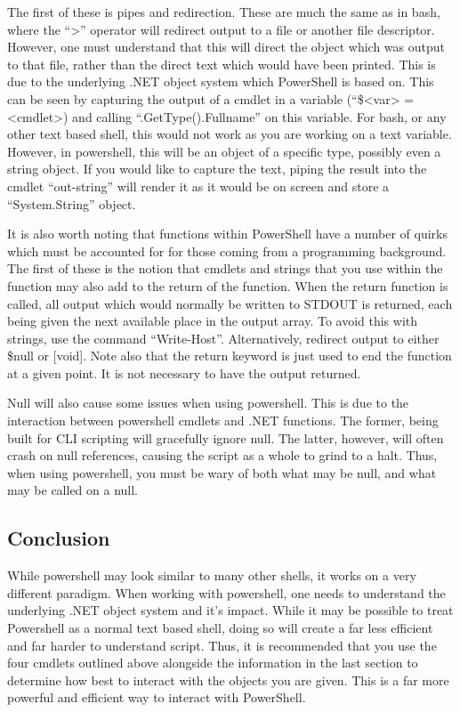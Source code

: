 \documentclass[a4paper,11pt]{report}
\begin{document}
			The first of these is pipes and redirection. 
			These are much the same as in bash, where the ``>'' operator will redirect output to a file or another file descriptor. 
			However, one must understand that this will direct the object which was output to that file, rather than the direct text which would have been printed. 
			This is due to the underlying .NET object system which PowerShell is based on. 
			This can be seen by capturing the output of a cmdlet in a variable (``\$<var> = <cmdlet>) and calling ``.GetType().Fullname'' on this variable.
			For bash, or any other text based shell, this would not work as you are working on a text variable. 
			However, in powershell, this will be an object of a specific type, possibly even a string object. 
			If you would like to capture the text, piping the result into the cmdlet ``out-string'' will render it as it would be on screen and store a ``System.String'' object. 

			It is also worth noting that functions within PowerShell have a number of quirks which must be accounted for for those coming from a programming background. 
			The first of these is the notion that cmdlets and strings that you use within the function may also add to the return of the function. 
			When the return function is called, all output which would normally be written to STDOUT is returned, each being given the next available place in the output array. 
			To avoid this with strings, use the command ``Write-Host''. 
			Alternatively, redirect output to either \$null or [void]. 
			Note also that the return keyword is just used to end the function at a given point. 
			It is not necessary to have the output returned. 

			Null will also cause some issues when using powershell. 
			This is due to the interaction between powershell cmdlets and .NET functions. 
			The former, being built for CLI scripting will gracefully ignore null. 
			The latter, however, will often crash on null references, causing the script as a whole to grind to a halt. 
			Thus, when using powershell, you must be wary of both what may be null, and what may be called on a null. 
			
		\subsection{Conclusion}
			While powershell may look similar to many other shells, it works on a very different paradigm. 
			When working with powershell, one needs to understand the underlying .NET object system and it's impact. 
			While it may be possible to treat Powershell as a normal text based shell, doing so will create a far less efficient and far harder to understand script. 
			Thus, it is recommended that you use the four cmdlets outlined above alongside the information in the last section to determine how best to interact with the objects you are given. 
			This is a far more powerful and efficient way to interact with PowerShell. 
\end{document}
